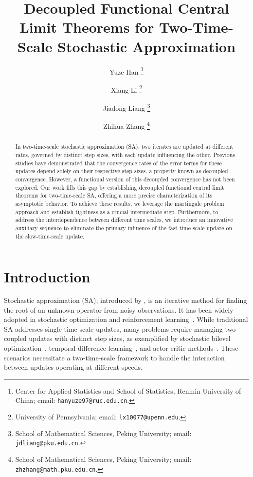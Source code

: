 \documentclass[11pt]{article}
\title{Decoupled Functional Central Limit Theorems for Two-Time-Scale Stochastic Approximation}
\author{
Yuze Han 
\thanks{Center for Applied Statistics and School of Statistics, Renmin University of China; email: \texttt{hanyuze97@ruc.edu.cn}.}
\and
Xiang Li 
\thanks{University of Pennsylvania; email: \texttt{lx10077@upenn.edu}. } 
\and
Jiadong Liang 
\thanks{School of Mathematical Sciences, Peking University; email: \texttt{jdliang@pku.edu.cn}. }
\and
Zhihua Zhang 
\thanks{School of Mathematical Sciences, Peking University; email: \texttt{zhzhang@math.pku.edu.cn}. }
}
\theoremstyle{plain}
\theoremstyle{definition}
\begin{document}
\maketitle

\begin{abstract}%
In two-time-scale stochastic approximation (SA), two iterates are updated at different rates, governed by distinct step sizes, with each update influencing the other. Previous studies have demonstrated that the convergence rates of the error terms for these updates depend solely on their respective step sizes, a property known as decoupled convergence. However, a functional version of this decoupled convergence has not been explored.
Our work fills this gap by establishing decoupled functional central limit theorems for two-time-scale SA, offering a more precise characterization of its asymptotic behavior. To achieve these results, we leverage the martingale problem approach and establish tightness as a crucial intermediate step. Furthermore, to address the interdependence between different time scales, we introduce an innovative auxiliary sequence to eliminate the primary influence of the fast-time-scale update on the slow-time-scale update.

\end{abstract}


\section{Introduction}

\label{sec:intro}

Stochastic approximation (SA), introduced by \cite{robbins1951stochastic}, is an iterative method for finding the root of an unknown operator from noisy observations. It has been widely adopted in stochastic optimization and reinforcement learning~\citep{kushner2003stochastic, borkar2009stochastic, mou2020linear, mou2022banach, mou2022optimal, li2021polyak, li2023online}.
While traditional SA addresses single-time-scale updates, many problems require managing two coupled updates with distinct step sizes, as exemplified by stochastic bilevel optimization~\citep{ghadimi2018approximation, chen2021closing, hong2023two}, temporal difference learning~\citep{sutton2009fast, xu2019two, xu2021sample, wang2021non}, and actor-critic methods~\citep{borkar1997actor, konda2003onactor, wu2020finite, xu2020non}. These scenarios necessitate a two-time-scale framework to handle the interaction between updates operating at different speeds.
\end{document}
